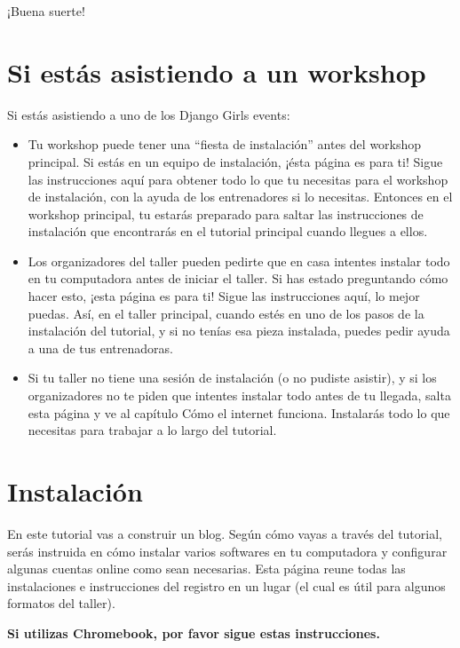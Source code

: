\documentclass[
  a4paper,
  DIV=11,
  numbers=noendperiod,
  onepage,
  openany]{scrreprt}
\begin{document}
¡Buena suerte!

\chapter{Si estás asistiendo a un
workshop}\label{si-estuxe1s-asistiendo-a-un-workshop}

Si estás asistiendo a uno de los Django Girls events:

\begin{itemize}
\item
  Tu workshop puede tener una ``fiesta de instalación'' antes del
  workshop principal. Si estás en un equipo de instalación, ¡ésta página
  es para ti! Sigue las instrucciones aquí para obtener todo lo que tu
  necesitas para el workshop de instalación, con la ayuda de los
  entrenadores si lo necesitas. Entonces en el workshop principal, tu
  estarás preparado para saltar las instrucciones de instalación que
  encontrarás en el tutorial principal cuando llegues a ellos.
\item
  Los organizadores del taller pueden pedirte que en casa intentes
  instalar todo en tu computadora antes de iniciar el taller. Si has
  estado preguntando cómo hacer esto, ¡esta página es para ti! Sigue las
  instrucciones aquí, lo mejor puedas. Así, en el taller principal,
  cuando estés en uno de los pasos de la instalación del tutorial, y si
  no tenías esa pieza instalada, puedes pedir ayuda a una de tus
  entrenadoras.
\item
  Si tu taller no tiene una sesión de instalación (o no pudiste
  asistir), y si los organizadores no te piden que intentes instalar
  todo antes de tu llegada, salta esta página y ve al capítulo Cómo el
  internet funciona. Instalarás todo lo que necesitas para trabajar a lo
  largo del tutorial.
\end{itemize}

\chapter{Instalación}\label{instalaciuxf3n-1}

En este tutorial vas a construir un blog. Según cómo vayas a través del
tutorial, serás instruida en cómo instalar varios softwares en tu
computadora y configurar algunas cuentas online como sean necesarias.
Esta página reune todas las instalaciones e instrucciones del registro
en un lugar (el cual es útil para algunos formatos del taller).

\textbf{Si utilizas Chromebook, por favor sigue estas instrucciones.}
\end{document}
